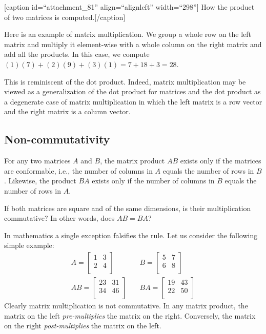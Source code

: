 \documentclass[
  a4paper,
]{article}
\begin{document}
{[}caption id=``attachment\_81'' align=``alignleft'' width=``298''{]}
How the product of two matrices is computed.{[}/caption{]}

Here is an example of matrix multiplication. We group a whole row on the
left matrix and multiply it element-wise with a whole column on the
right matrix and add all the products. In this case, we compute
\((1)(7) + (2)(9) + (3)(1) = 7 + 18 + 3 = 28\).

This is reminiscent of the dot product. Indeed, matrix multiplication
may be viewed as a generalization of the dot product for matrices and
the dot product as a degenerate case of matrix multiplication in which
the left matrix is a row vector and the right matrix is a column vector.

\hypertarget{non-commutativity}{%
\subsection{Non-commutativity}\label{non-commutativity}}

For any two matrices \(A\) and \(B\), the matrix product \(AB\) exists
only if the matrices are conformable, i.e., the number of columns in
\(A\) equals the number of rows in \(B\). Likewise, the product \(BA\)
exists only if the number of columns in \(B\) equals the number of rows
in \(A\).

If both matrices are square and of the same dimensions, is their
multiplication commutative? In other words, does \(AB = BA\)?

In mathematics a single exception falsifies the rule. Let us consider
the following simple example: \[
\begin{aligned}
A = \left[
\begin{matrix}
1 & 3\\
2 & 4\\
\end{matrix}
\right]
&\quad
B = \left[
\begin{matrix}
5 & 7\\
6 & 8\\
\end{matrix}
\right]
\\
AB = \left[
\begin{matrix}
23 & 31\\
34 & 46\\
\end{matrix}
\right]
&\quad
BA = \left[
\begin{matrix}
19 & 43\\
22 & 50\\
\end{matrix}
\right]
\end{aligned}
\] Clearly matrix multiplication is not commutative. In any matrix
product, the matrix on the left \emph{pre-multiplies} the matrix on the
right. Conversely, the matrix on the right \emph{post-multiplies} the
matrix on the left.
\end{document}
